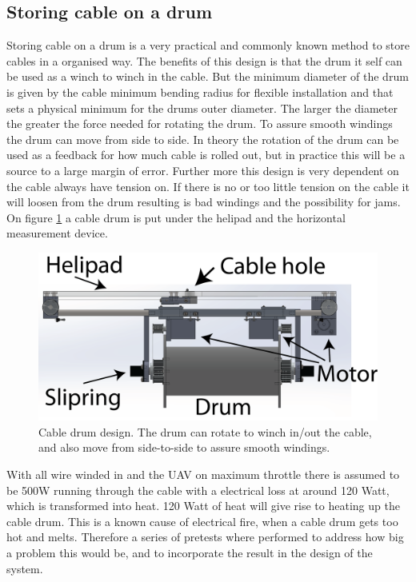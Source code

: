 \subsection{Storing cable on a drum}
Storing cable on a drum is a very practical and commonly known method to store cables in a organised way. The benefits of this design is that the drum it self can be used as a winch to winch in the cable. But the minimum diameter of the drum is given by the cable minimum bending radius for flexible installation and that sets a physical minimum for the drums outer diameter. The larger the diameter the greater the force needed for rotating the drum. To assure smooth windings the drum can move from side to side. 
In theory the rotation of the drum can be used as a feedback for how much cable is rolled out, but in practice this will be a source to a large margin of error. Further more this design is very dependent on the cable always have tension on. If there is no or too little tension on the cable it will loosen from the drum resulting is bad windings and the possibility for jams. \\
On figure \ref{fig:cable-drum} a cable drum is put under the helipad and the horizontal measurement device. 

\begin{figure}[H]
\centering
\includegraphics[scale=0.75]{graphics/cad/cable-drum.png}
\caption[Cable drum design]{Cable drum design. The drum can rotate to winch in/out the cable, and also move from side-to-side to assure smooth windings.}
\label{fig:cable-drum}
\end{figure}

\noindent
With all wire winded in and the UAV on maximum throttle there is assumed to be 500W running through the cable with a electrical loss at around 120 Watt, which is transformed into heat. 120 Watt of heat will give rise to heating up the cable drum. This is a known cause of electrical fire, when a cable drum gets too hot and melts. Therefore a series of pretests where performed to address how big a problem this would be, and to incorporate the result in the design of the system. 

